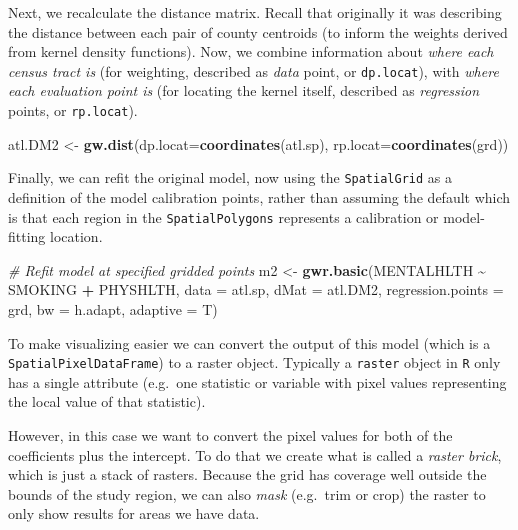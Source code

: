 \documentclass[
]{book}
\newenvironment{Shaded}{\begin{snugshade}}{\end{snugshade}}
\newcommand{\AttributeTok}[1]{\textcolor[rgb]{0.13,0.29,0.53}{#1}}
\newcommand{\CommentTok}[1]{\textcolor[rgb]{0.56,0.35,0.01}{\textit{#1}}}
\newcommand{\FunctionTok}[1]{\textcolor[rgb]{0.13,0.29,0.53}{\textbf{#1}}}
\newcommand{\NormalTok}[1]{#1}
\newcommand{\OtherTok}[1]{\textcolor[rgb]{0.56,0.35,0.01}{#1}}
\newcommand{\SpecialCharTok}[1]{\textcolor[rgb]{0.81,0.36,0.00}{\textbf{#1}}}
\begin{document}
Next, we recalculate the distance matrix. Recall that originally it was describing the distance between each pair of county centroids (to inform the weights derived from kernel density functions). Now, we combine information about \emph{where each census tract is} (for weighting, described as \emph{data} point, or \texttt{dp.locat}), with \emph{where each evaluation point is} (for locating the kernel itself, described as \emph{regression} points, or \texttt{rp.locat}).

\begin{Shaded}
\begin{Highlighting}[]
\NormalTok{atl.DM2 }\OtherTok{\textless{}{-}} \FunctionTok{gw.dist}\NormalTok{(}\AttributeTok{dp.locat=}\FunctionTok{coordinates}\NormalTok{(atl.sp),}
              \AttributeTok{rp.locat=}\FunctionTok{coordinates}\NormalTok{(grd))}
\end{Highlighting}
\end{Shaded}

Finally, we can refit the original model, now using the \texttt{SpatialGrid} as a definition of the model calibration points, rather than assuming the default which is that each region in the \texttt{SpatialPolygons} represents a calibration or model-fitting location.

\begin{Shaded}
\begin{Highlighting}[]
\CommentTok{\# Refit model at specified gridded points}
\NormalTok{m2 }\OtherTok{\textless{}{-}} \FunctionTok{gwr.basic}\NormalTok{(MENTALHLTH }\SpecialCharTok{\textasciitilde{}}\NormalTok{ SMOKING }\SpecialCharTok{+}\NormalTok{ PHYSHLTH, }
                \AttributeTok{data =}\NormalTok{ atl.sp,}
                \AttributeTok{dMat =}\NormalTok{ atl.DM2, }
                \AttributeTok{regression.points =}\NormalTok{ grd,}
                \AttributeTok{bw =}\NormalTok{ h.adapt,}
                \AttributeTok{adaptive =}\NormalTok{ T)}
\end{Highlighting}
\end{Shaded}

To make visualizing easier we can convert the output of this model (which is a \texttt{SpatialPixelDataFrame}) to a raster object. Typically a \texttt{raster} object in \texttt{R} only has a single attribute (e.g.~one statistic or variable with pixel values representing the local value of that statistic).

However, in this case we want to convert the pixel values for both of the coefficients plus the intercept. To do that we create what is called a \emph{raster brick}, which is just a stack of rasters. Because the grid has coverage well outside the bounds of the study region, we can also \emph{mask} (e.g.~trim or crop) the raster to only show results for areas we have data.
\end{document}
